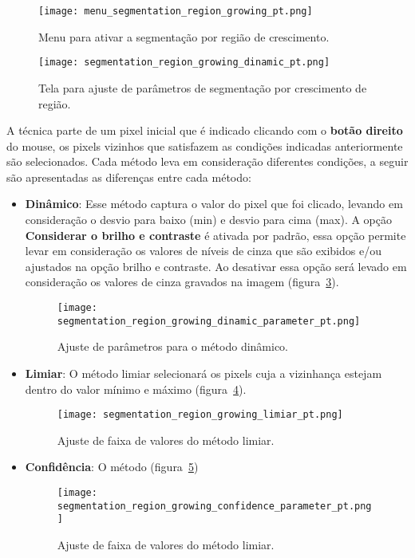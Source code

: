 \begin{figure}[!htb]
\centering
\texttt{[image: menu\_segmentation\_region\_growing\_pt.png]}
\caption{Menu para ativar a segmentação por região de crescimento.}
\label{fig:menu_segmentation_region_growing_pt}
\end{figure}

\begin{figure}[!htb]
\centering
\texttt{[image: segmentation\_region\_growing\_dinamic\_pt.png]}
\caption{Tela para ajuste de parâmetros de segmentação por crescimento de região.}
\label{fig:segmentation_region_growing_dinamic}
\end{figure}

A técnica parte de um pixel inicial que é indicado clicando com o \textbf{botão direito} do mouse, os pixels vizinhos que satisfazem as condições indicadas anteriormente são selecionados. Cada método leva em consideração diferentes condições, a seguir são apresentadas as diferenças entre cada método:

\begin{itemize}
	\item \textbf{Dinâmico}: Esse método captura o valor do pixel que foi clicado, levando em consideração o desvio para baixo (min) e desvio para cima (max). A opção \textbf{Considerar o brilho e contraste} é ativada por padrão, essa opção permite levar em consideração os valores de níveis de cinza que são exibidos e/ou ajustados na opção brilho e contraste. Ao desativar essa opção será levado em consideração os valores de cinza gravados na imagem (figura~\ref{fig:segmentation_region_growing_dinamic_parameter}). 
	
	\begin{figure}[!htb]
	\centering
	\texttt{[image: segmentation\_region\_growing\_dinamic\_parameter\_pt.png]}
	\caption{Ajuste de parâmetros para o método dinâmico.}
	\label{fig:segmentation_region_growing_dinamic_parameter}
	\end{figure}
	
	\item \textbf{Limiar}: O método limiar selecionará os pixels cuja a vizinhança estejam dentro do valor mínimo e máximo (figura~\ref{fig:segmentation_region_growing_limiar}).

	\begin{figure}[!htb]
	\centering
	\texttt{[image: segmentation\_region\_growing\_limiar\_pt.png]}
	\caption{Ajuste de faixa de valores do método limiar.}
	\label{fig:segmentation_region_growing_limiar}
	\end{figure}	
	
	\item \textbf{Confidência}: O método (figura~\ref{fig:segmentation_region_growing_confidence_parameter})
	
	\begin{figure}[!htb]
	\centering
	\texttt{[image: segmentation\_region\_growing\_confidence\_parameter\_pt.png]}
	\caption{Ajuste de faixa de valores do método limiar.}
	\label{fig:segmentation_region_growing_confidence_parameter}
	\end{figure}	
	
	
\end{itemize}